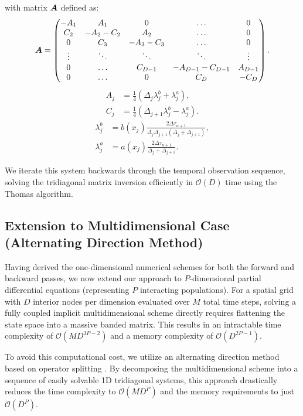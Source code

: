 \documentclass{article}
\def\A{\mbox{\boldmath $A$}}
\begin{document}
with matrix $\A$ defined as:
\begin{equation}\label{eq:backward_cn_matrix}
\A =
\begin{pmatrix}
    -A_1 & A_1 & 0 & \hdots & 0 \\
    C_2 & -A_2 - C_2 & A_2 & \hdots & 0 \\
    0 & C_3 & -A_3 - C_3 & \hdots & 0 \\
    \vdots & \ddots & \ddots & \ddots & \vdots\\
    0 & \hdots & C_{D-1} & -A_{D-1} - C_{D-1} & A_{D-1} \\
    0 & \hdots & 0 & C_D & -C_D
\end{pmatrix}.
\end{equation}
$$
\begin{aligned}
    A_j &= \frac{1}{4}\left( \Delta_j \lambda_j^b + \lambda_j^a \right), \\
    C_j &= \frac{1}{4}\left( \Delta_{j+1} \lambda_j^b - \lambda_j^a \right).
\end{aligned}
$$
$$
\begin{aligned}
    \lambda_j^b &= b(x_j) \frac{2 \Delta \tau_{n+1}}{\Delta_j \Delta_{j+1}(\Delta_j + \Delta_{j+1})}, \\
    \lambda_j^a &= a(x_j) \frac{2\Delta \tau_{n+1}}{\Delta_j + \Delta_{j+1}}.
\end{aligned}
$$

We iterate this system backwards through the temporal observation sequence, solving the tridiagonal matrix inversion efficiently in $\mathcal{O}(D)$ time using the Thomas algorithm.

\subsection{Extension to Multidimensional Case (Alternating Direction Method)}

Having derived the one-dimensional numerical schemes for both the forward and backward passes, we now extend our approach to $P$-dimensional partial differential equations (representing $P$ interacting populations).
For a spatial grid with $D$ interior nodes per dimension evaluated over $M$ total time steps, solving a fully coupled implicit multidimensional scheme directly requires flattening the state space into a massive banded matrix.
This results in an intractable time complexity of $\mathcal{O}(M D^{3P-2})$ and a memory complexity of $\mathcal{O}(D^{2P-1})$.

To avoid this computational cost, we utilize an alternating direction method based on operator splitting \citep[p. 1051]{press2007}.
By decomposing the multidimensional scheme into a sequence of easily solvable 1D tridiagonal systems, this approach drastically reduces the time complexity to $\mathcal{O}(M D^P)$ and the memory requirements to just $\mathcal{O}(D^P)$.
\end{document}
